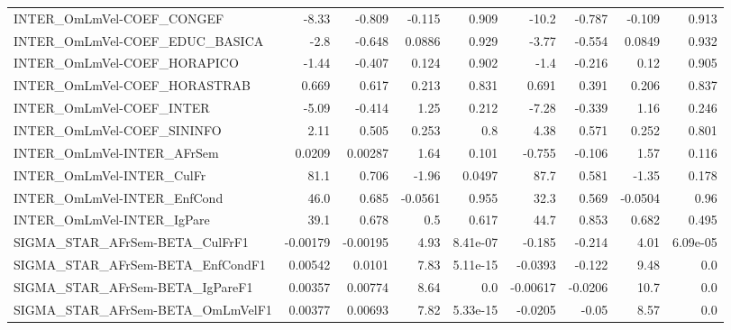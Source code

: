 \begin{tabular}{lrrrrrrrr}
INTER\_OmLmVel-COEF\_CONGEF             &       -8.33 &       -0.809 &  -0.115 &    0.909 &      -10.2 &      -0.787 &       -0.109 &         0.913 \\
INTER\_OmLmVel-COEF\_EDUC\_BASICA        &        -2.8 &       -0.648 &  0.0886 &    0.929 &      -3.77 &      -0.554 &       0.0849 &         0.932 \\
INTER\_OmLmVel-COEF\_HORAPICO           &       -1.44 &       -0.407 &   0.124 &    0.902 &       -1.4 &      -0.216 &         0.12 &         0.905 \\
INTER\_OmLmVel-COEF\_HORASTRAB          &       0.669 &        0.617 &   0.213 &    0.831 &      0.691 &       0.391 &        0.206 &         0.837 \\
INTER\_OmLmVel-COEF\_INTER              &       -5.09 &       -0.414 &    1.25 &    0.212 &      -7.28 &      -0.339 &         1.16 &         0.246 \\
INTER\_OmLmVel-COEF\_SININFO            &        2.11 &        0.505 &   0.253 &      0.8 &       4.38 &       0.571 &        0.252 &         0.801 \\
INTER\_OmLmVel-INTER\_AFrSem            &      0.0209 &      0.00287 &    1.64 &    0.101 &     -0.755 &      -0.106 &         1.57 &         0.116 \\
INTER\_OmLmVel-INTER\_CulFr             &        81.1 &        0.706 &   -1.96 &   0.0497 &       87.7 &       0.581 &        -1.35 &         0.178 \\
INTER\_OmLmVel-INTER\_EnfCond           &        46.0 &        0.685 & -0.0561 &    0.955 &       32.3 &       0.569 &      -0.0504 &          0.96 \\
INTER\_OmLmVel-INTER\_IgPare            &        39.1 &        0.678 &     0.5 &    0.617 &       44.7 &       0.853 &        0.682 &         0.495 \\
SIGMA\_STAR\_AFrSem-BETA\_CulFrF1        &    -0.00179 &     -0.00195 &    4.93 & 8.41e-07 &     -0.185 &      -0.214 &         4.01 &      6.09e-05 \\
SIGMA\_STAR\_AFrSem-BETA\_EnfCondF1      &     0.00542 &       0.0101 &    7.83 & 5.11e-15 &    -0.0393 &      -0.122 &         9.48 &           0.0 \\
SIGMA\_STAR\_AFrSem-BETA\_IgPareF1       &     0.00357 &      0.00774 &    8.64 &      0.0 &   -0.00617 &     -0.0206 &         10.7 &           0.0 \\
SIGMA\_STAR\_AFrSem-BETA\_OmLmVelF1      &     0.00377 &      0.00693 &    7.82 & 5.33e-15 &    -0.0205 &       -0.05 &         8.57 &           0.0 \\

\end{tabular}
